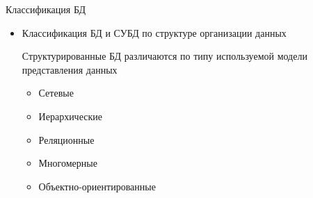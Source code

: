 \documentclass[12pt]{article}
\begin{document}
\begin{nota}{Классификация БД}
\begin{itemize}
        \begin{itemize}
            \item Документальные
            
            \begin{itemize}
                \item Предназначены для хранения слабо структурированных данных. Единицей хранения является документ, заданный конечным (но не фиксированным) набором полей в общем случае произвольной длины. Значение поля может иметь сложную структуру и зависеть от контекста использования 
                \item Пользователю в ответ на его запрос выдается либо ссылка на документ, либо сам документ, в котором он может найти интересующую информацию
                \item Использование: гипертекстовые документы в сети Интернет
                \item Информационно-справочные или информационно-поисковые системы 
            \end{itemize}
            \item Фактографические
            
            \begin{itemize}
                \item Ориентированы на хранение хорошо структурированных данных. Единицей информации служит описание факта конечным, четко определенным множеством свойств. Каждое свойство факта (объекта) имеет атомарное значение, которое не зависит от контекста использования
                \item Использование: БД оперативной обработки транзакций (OLTP) -- операционные БД, БД оперативной аналитической обработки (OLAP) -- хранилища данных (Data Warehouse)
            \end{itemize}
        \end{itemize}

        \item Классификация БД и СУБД по структуре организации данных 
        
        Структурированные БД различаются по типу используемой модели представления данных 

        \begin{itemize}
            \item Сетевые
            \item Иерархические
            \item Реляционные
            \item Многомерные 
            \item Объектно-ориентированные 
        \end{itemize}
    \end{itemize}
\end{nota}
\end{document}
